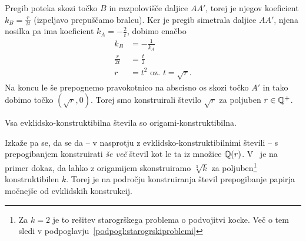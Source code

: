 \begin{dokaz}
    Pregib poteka skozi točko $B$ in razpolovišče daljice $AA'$, torej je njegov koeficient $k_B = \frac{r}{2t}$ (izpeljavo prepuščamo bralcu). Ker je pregib simetrala daljice $AA'$, njena nosilka pa ima koeficient $k_A = - \frac{2}{t}$, dobimo enačbo
    \begin{align*}
        k_B &= - \frac{1}{k_A}\\
        \frac{r}{2t} &= \frac{t}{2}\\
        r &= t^2 \text{ oz. } t = \sqrt{r}.
    \end{align*}
    Na koncu le še prepognemo pravokotnico na abscisno os skozi točko $A'$ in tako dobimo točko $(\sqrt{r}, 0)$. Torej smo konstruirali število $\sqrt{r}$ za poljuben $r \in \mathbb Q^{+}$.
\end{dokaz}

\begin{posledica}
    \label{posl:evkl_origami_konstruktibilnost}
    Vsa evklidsko-konstruktibilna števila so origami-konstruktibilna.
\end{posledica}

Izkaže pa se, da se da -- v nasprotju z evklidsko-konstruktibilnimi števili -- s prepogibanjem konstruirati \emph{še več} števil kot le ta iz množice $\mathbb Q(r)$. V~\cite[str.\ 156]{geometricconstructions} je na primer dokaz, da lahko z origamijem skonstruiramo $\sqrt[3]{k} $ za poljuben\footnote{Za $k = 2$ je to rešitev starogrškega problema o podvojitvi kocke. Več o tem sledi v podpoglavju~\ref{podpogl:starogrskiproblemi}} konstruktibilen $k$. Torej je na področju konstruiranja števil prepogibanje papirja močnejše od evklidskih konstrukcij.